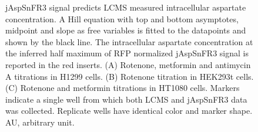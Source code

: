 \documentclass[9pt,lineno]{elife}
\begin{document}
\begin{figure}[ht!]
\centering
{}
\caption{
jAspSnFR3 signal predicts LCMS measured intracellular aspartate concentration.
A Hill equation with top and bottom asymptotes, midpoint and slope as free variables is fitted to the datapoints and shown by the black line.
The intracellular aspartate concentration at the inferred half maximum of RFP normalized jAspSnFR3 signal is reported in the red inserts.
(A) Rotenone, metformin and antimycin A titrations in H1299 cells.
(B) Rotenone titration in HEK293t cells.
(C) Rotenone and metformin titrations in HT1080 cells.
Markers indicate a single well from which both LCMS and jAspSnFR3 data was collected.
Replicate wells have identical color and marker shape.
AU, arbitrary unit.
}
\label{fig:Fig3}
\label{figsupp:f3S1}
\end{figure}
\end{document}
